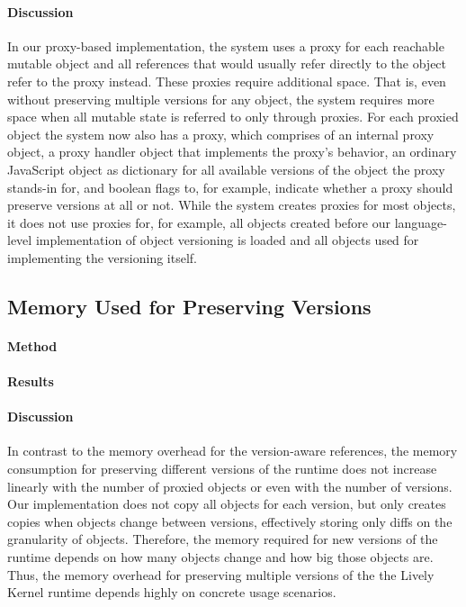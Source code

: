 \paragraph{Discussion}
In our proxy-based implementation, the system uses a proxy for each reachable mutable object and all references that would usually refer directly to the object refer to the proxy instead.
These proxies require additional space.
That is, even without preserving multiple versions for any object, the system requires more space when all mutable state is referred to only through proxies.
For each proxied object the system now also has a proxy, which comprises of an internal proxy object, a proxy handler object that implements the proxy's behavior, an ordinary JavaScript object as dictionary for all available versions of the object the proxy stands-in for, and boolean flags to, for example, indicate whether a proxy should preserve versions at all or not.
While the system creates proxies for most objects, it does not use proxies for, for example, all objects created before our language-level implementation of object versioning is loaded and all objects used for implementing the versioning itself.




\subsection{Memory Used for Preserving Versions}

\paragraph{Method}

\paragraph{Results}


\paragraph{Discussion}
In contrast to the memory overhead for the version-aware references, the memory consumption for preserving different versions of the runtime does not increase linearly with the number of proxied objects or even with the number of versions.
Our implementation does not copy all objects for each version, but only creates copies when objects change between versions, effectively storing only diffs on the granularity of objects.
Therefore, the memory required for new versions of the runtime depends on how many objects change and how big those objects are.
Thus, the memory overhead for preserving multiple versions of the the Lively Kernel runtime depends highly on concrete usage scenarios.




